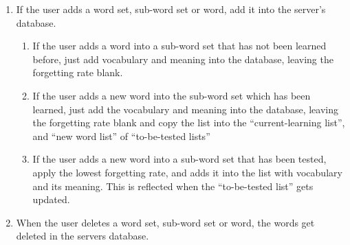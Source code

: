 \documentclass[conference]{IEEEtran}
\begin{document}
\begin{enumerate}
\begin{enumerate}
        \item If the user adds a word set, sub-word set or word, add it into the server’s database.
        \begin{enumerate}
            \item If the user adds a word into a sub-word set that has not been learned before, just add vocabulary and meaning into the database, leaving the forgetting rate blank.
            \item If the user adds a new word into the sub-word set which has been learned, just add the vocabulary and meaning into the database, leaving the forgetting rate blank and copy the list into the “current-learning list”, and “new word list” of “to-be-tested lists”
            \item If the user adds a new word into a sub-word set that has been tested, apply the lowest forgetting rate, and adds it into the list with vocabulary and its meaning. This is reflected when the “to-be-tested list” gets updated.
        \end{enumerate}
        \item When the user deletes a word set, sub-word set or word, the words get deleted in the servers database.
    \end{enumerate}
    

\end{enumerate}
\end{document}
